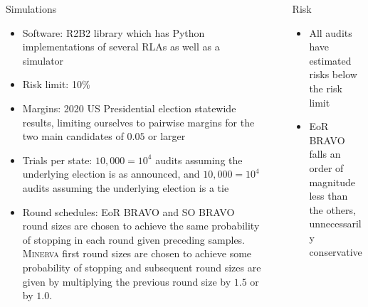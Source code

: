 \documentclass[final]{beamer}
\newcommand{\Minerva}{\textsc{Minerva}\xspace}
\newcommand{\BRAVO}{\textsc{BRAVO}\xspace}
\newlength{\sepwidth}
\newlength{\colwidth}
\newcommand{\separatorcolumn}{\begin{column}{\sepwidth}\end{column}}
\begin{document}
\begin{frame}[t]
\begin{columns}[t]
\begin{column}{\colwidth}
\begin{block}{Simulations}
\begin{itemize}
\item 
Software: R2B2 library \cite{r2b2} which has Python implementations of several RLAs as well as a simulator
\item 
Risk limit: 10\%
\item
Margins: 2020 US Presidential election statewide results, limiting ourselves to pairwise margins
for the two main candidates of $0.05$ or larger
\item 
Trials per state: $10,000=10^4$ audits assuming the underlying election is as announced,  
and $10,000=10^4$ audits assuming the underlying election is a tie
\item 
Round schedules: EoR \BRAVO and SO \BRAVO round sizes are chosen to achieve the same
probability of stopping in each round given preceding samples. \Minerva first round sizes
are chosen to achieve some probability of stopping and subsequent round sizes are given by multiplying the previous
round size by $1.5$ or by $1.0$.
\end{itemize}
\end{block}

\end{column}

\separatorcolumn

\begin{column}{\colwidth}

\begin{block}{Risk}

\begin{itemize}
\item 
All audits have estimated risks below the risk limit
\item
EoR \BRAVO falls an order of magnitude less than the others, unnecessarily conservative
\end{itemize}


\end{block}
\end{column}
\end{columns}
\end{frame}
\end{document}
